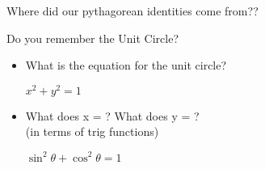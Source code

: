 \begin{frame}{Where did our pythagorean identities come from??
}

\Large {Do you remember the Unit Circle?}
\begin{itemize}
    \item What is the equation for the unit circle? \pause
    \begin{center}
        $x^2+y^2 = 1$
    \pause
    \end{center}
    \item What does x = ? What does y = ? \\
    \quad \quad \quad \quad (in terms of trig functions)
    \pause
    \begin{center}
        $\sin^2\theta + \cos^2\theta = 1$
    \end{center} 

\end{itemize}
    
\end{frame}
